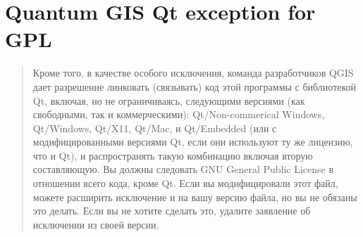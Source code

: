 \section{Quantum GIS Qt exception for GPL}\label{qgis_qt_exception_appendix_ru}

\begin{quotation}
Кроме того, в качестве особого исключения, команда разработчиков QGIS
дает разрешение линковать (связывать) код этой программы с библиотекой
Qt, включая, но не ограничиваясь, следующими версиями (как свободными,
так и коммерческими): Qt/Non-commerical Windows, Qt/Windows, Qt/X11,
Qt/Mac, и Qt/Embedded (или с модифицированными версиями Qt, если они
используют ту же лицензию, что и Qt), и распространять такую комбинацию
включая вторую составляющую. Вы должны следовать GNU General Public
License в отношении всего кода, кроме Qt. Если вы модифицировали этот
файл, можете расширить исключение и на вашу версию файла, но вы не
обязаны это делать. Если вы не хотите сделать это, удалите заявление об
исключении из своей версии.
\end{quotation}
